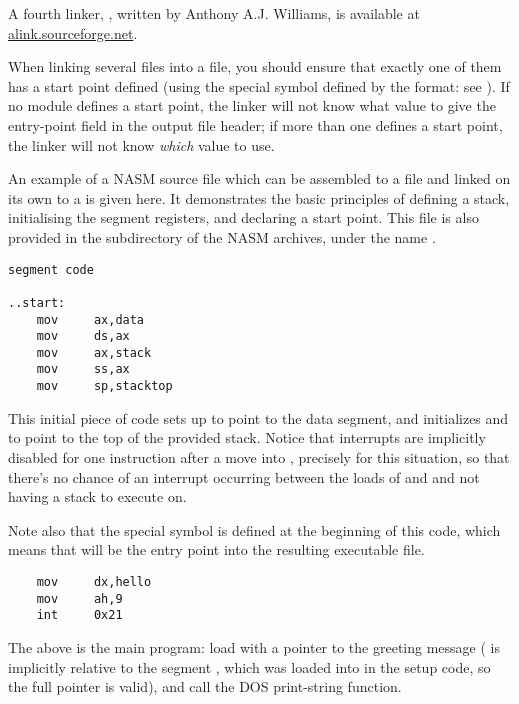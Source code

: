 A fourth linker, , written by
Anthony A.J. Williams, is available at \href{http://alink.sourceforge.net}
{alink.sourceforge.net}.

When linking several  files into a  file, you should
ensure that exactly one of them has a start point defined (using the
 special symbol defined by the
 format: see ). If no module defines a start
point, the linker will not know what value to give the entry-point
field in the output file header; if more than one defines a start
point, the linker will not know \emph{which} value to use.

An example of a NASM source file which can be assembled to a
 file and linked on its own to a  is given here. It
demonstrates the basic principles of defining a stack, initialising
the segment registers, and declaring a start point. This file is
also provided in the  subdirectory of
the NASM archives, under the name .

\begin{lstlisting}
segment code

..start:
    mov     ax,data
    mov     ds,ax
    mov     ax,stack
    mov     ss,ax
    mov     sp,stacktop
\end{lstlisting}

This initial piece of code sets up  to point to the data
segment, and initializes  and  to point to the top of
the provided stack. Notice that interrupts are implicitly disabled
for one instruction after a move into , precisely for this
situation, so that there's no chance of an interrupt occurring
between the loads of  and  and not having a stack to
execute on.

Note also that the special symbol  is defined at the
beginning of this code, which means that will be the entry point
into the resulting executable file.

\begin{lstlisting}
    mov     dx,hello
    mov     ah,9
    int     0x21
\end{lstlisting}

The above is the main program: load  with a pointer to the
greeting message ( is implicitly relative to the segment
, which was loaded into  in the setup code, so the
full pointer is valid), and call the DOS print-string function.

